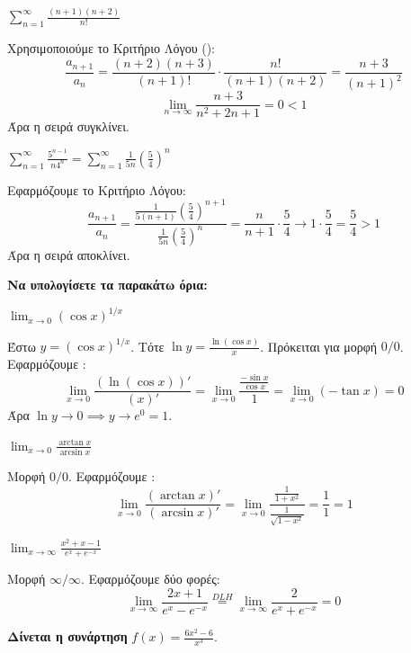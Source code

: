 \begin{thema}[label=\bf\large{ΘΕΜΑ \textcolor{black}{\arabic*}}]
\begin{rlist}
    \item $\displaystyle \sum_{n=1}^{\infty} \frac{(n+1)(n+2)}{n!}$
    
    Χρησιμοποιούμε το Κριτήριο Λόγου ():
    \[ \frac{a_{n+1}}{a_n} = \frac{(n+2)(n+3)}{(n+1)!} \cdot \frac{n!}{(n+1)(n+2)} = \frac{n+3}{(n+1)^2} \]
    \[ \lim_{n\to\infty} \frac{n+3}{n^2+2n+1} = 0 < 1 \]
    Άρα η σειρά συγκλίνει.

    \item $\displaystyle \sum_{n=1}^{\infty} \frac{5^{n-1}}{n 4^n} = \sum_{n=1}^{\infty} \frac{1}{5n} \left(\frac{5}{4}\right)^n$
    
    Εφαρμόζουμε το Κριτήριο Λόγου:
    \[ \frac{a_{n+1}}{a_n} = \frac{\frac{1}{5(n+1)}(\frac{5}{4})^{n+1}}{\frac{1}{5n}(\frac{5}{4})^n} = \frac{n}{n+1} \cdot \frac{5}{4} \to 1 \cdot \frac{5}{4} = \frac{5}{4} > 1 \]
    Άρα η σειρά αποκλίνει.
\end{rlist}

\item %
\textbf{Να υπολογίσετε τα παρακάτω όρια:}

\begin{rlist}
    \item $\displaystyle \lim_{x\to 0} (\cos x)^{1/x}$
    
    Έστω $y = (\cos x)^{1/x}$. Τότε $\ln y = \frac{\ln(\cos x)}{x}$.
    Πρόκειται για μορφή $0/0$. Εφαρμόζουμε :
    \[ \lim_{x\to 0} \frac{(\ln(\cos x))'}{(x)'} = \lim_{x\to 0} \frac{\frac{-\sin x}{\cos x}}{1} = \lim_{x\to 0} (-\tan x) = 0 \]
    Άρα $\ln y \to 0 \implies y \to e^0 = 1$.

    \item $\displaystyle \lim_{x\to 0} \frac{\arctan x}{\arcsin x}$
    
    Μορφή $0/0$. Εφαρμόζουμε :
    \[ \lim_{x\to 0} \frac{(\arctan x)'}{(\arcsin x)'} = \lim_{x\to 0} \frac{\frac{1}{1+x^2}}{\frac{1}{\sqrt{1-x^2}}} = \frac{1}{1} = 1 \]

    \item $\displaystyle \lim_{x\to \infty} \frac{x^2+x-1}{e^x + e^{-x}}$
    
    Μορφή $\infty/\infty$. Εφαρμόζουμε  δύο φορές:
    \[ \lim_{x\to \infty} \frac{2x+1}{e^x - e^{-x}} \overset{DLH}{=} \lim_{x\to \infty} \frac{2}{e^x + e^{-x}} = 0 \]
\end{rlist}

\item %
\textbf{Δίνεται η συνάρτηση} $f(x) = \frac{6x^2-6}{x^3}$.


\end{thema}
